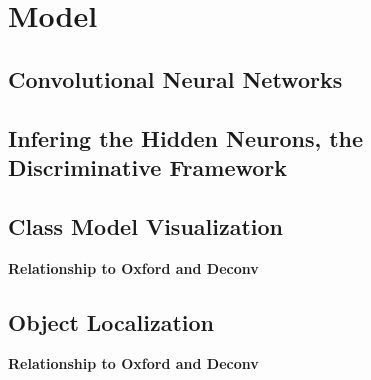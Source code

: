 \section{Model}
\label{sec:model}

\subsection{Convolutional Neural Networks}

\subsection{Infering the Hidden Neurons, the Discriminative Framework}

\subsection{Class Model Visualization}

\textbf{Relationship to Oxford and Deconv}

\subsection{Object Localization}

\textbf{Relationship to Oxford and Deconv}
